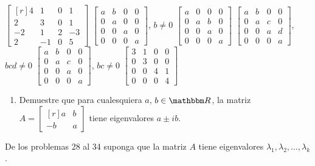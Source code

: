 \begin{tasks}[
    style=enumerate,
    label-offset = 3mm,
    ]
    \task $\begin{bmatrix*}[r]4 & 1 & 0 & 1 \\ 2 & 3 & 0 & 1 \\ -2 & 1 & 2 & -3 \\ 2 & -1 & 0 & 5\end{bmatrix*}$
    \task $\begin{bmatrix*}a & b & 0 & 0 \\ 0 & a & 0 & 0 \\ 0 & 0 & a & 0 \\ 0 & 0 & 0 & a\end{bmatrix*}$, $b \neq 0$
    \task $\begin{bmatrix*}a & 0 & 0 & 0 \\ 0 & a & b & 0 \\ 0 & 0 & a & 0 \\ 0 & 0 & 0 & a\end{bmatrix*}$
    \task $\begin{bmatrix*}a & b & 0 & 0 \\ 0 & a & c & 0 \\ 0 & 0 & a & d \\ 0 & 0 & 0 & a\end{bmatrix*}$, $b c d \neq 0$
    \task $\begin{bmatrix*}a & b & 0 & 0 \\ 0 & a & c & 0 \\ 0 & 0 & a & 0 \\ 0 & 0 & 0 & a\end{bmatrix*}$, $b c \neq 0$
    \task $\begin{bmatrix*}3 & 1 & 0 & 0 \\ 0 & 3 & 0 & 0 \\ 0 & 0 & 4 & 1 \\ 0 & 0 & 0 & 4\end{bmatrix*}$
\end{tasks}
\begin{enumerate}[start=27]
    \item Demuestre que para cualesquiera $a$, $b \in \RR$, la matriz $A=\begin{bmatrix*}[r]a & b \\ -b & a\end{bmatrix*}$ tiene eigenvalores $a \pm i b$.
\end{enumerate}
De los problemas 28 al 34 suponga que la matriz $A$ tiene eigenvalores $\lambda_{1}, \lambda_{2}, \dots, \lambda_{k}$.
